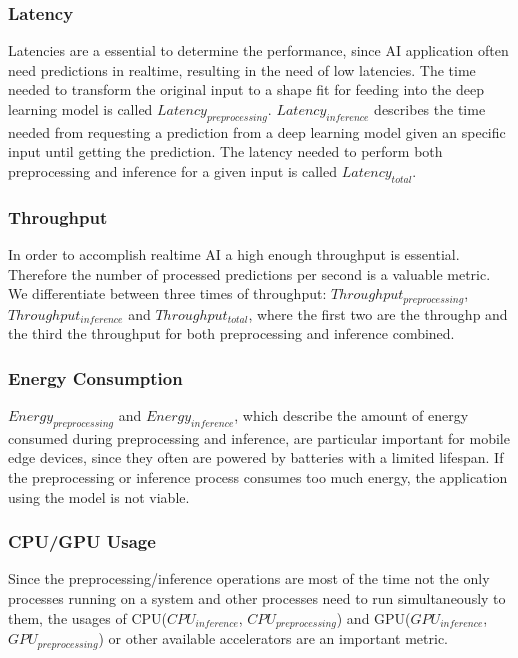 \subsubsection{Latency}
Latencies are a essential to determine the performance, since AI application often need predictions in realtime, resulting in the need of low latencies.
The time needed to transform the original input to a shape fit for feeding into the deep learning model is called $Latency_{preprocessing}$.
$Latency_{inference}$ describes the time needed from requesting a prediction from a deep learning model given an specific input until getting the prediction.
The latency needed to perform both preprocessing and inference for a given input is called $Latency_{total}$.
\subsubsection{Throughput}
In order to accomplish realtime AI a high enough throughput is essential. Therefore the number of processed predictions per second is a valuable metric. We differentiate between three times of throughput: $Throughput_{preprocessing}$, $Throughput_{inference}$ and $Throughput_{total}$, where the first two are the throughp and the third the throughput for both preprocessing and inference combined.



\subsubsection{Energy Consumption}
$Energy_{preprocessing}$ and $Energy_{inference}$, which describe the amount of energy consumed during preprocessing and inference, are particular important for mobile edge devices, since they often are powered by batteries with a limited lifespan. If the preprocessing or inference process consumes too much energy, the application using the model is not viable.


\subsubsection{CPU/GPU Usage}
Since the preprocessing/inference operations are most of the time not the only processes running on a system and other processes need to run simultaneously to them, the usages of CPU($CPU_{inference}$, $CPU_{preprocessing}$) and GPU($GPU_{inference}$, $GPU_{preprocessing}$) or other available accelerators are an important metric.


